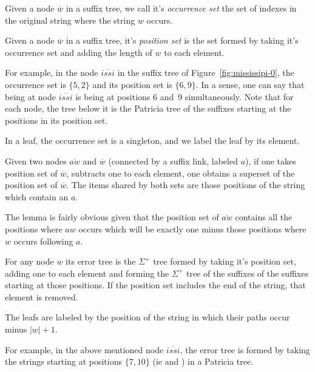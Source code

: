 \begin{definition}
Given a node $\overline{w}$ in a suffix tree, we call it's \emph{occurrence set} the set of indexes in the original string where the string $w$ occurs.
\end{definition}

\begin{definition}
Given a node $\overline{w}$ in a suffix tree, it's \emph{position set} is the set formed by taking it's occurrence set and adding the length of $w$ to each element.
\end{definition}

For example, in the node $\overline{issi}$ in the suffix tree of Figure~\ref{fig:mississipi-0}, the occurrence set is $\{5, 2\}$ and its position set is $\{6, 9\}$. In a sense, one can say that being at node $\overline{issi}$ is being at positions 6 and~9 simultaneously. Note that for each node, the tree below it is the Patricia tree of the suffixes starting at the positions in its position set.

In a leaf, the occurrence set is a singleton, and we label the leaf by its element.

\begin{lemma}\label{lemma:suffix-error}
Given two nodes $\overline{aw}$ and $\overline{w}$ (connected by a suffix link, labeled $a$), if one takes position set of $\overline{w}$, subtracts one to each element, one obtains a superset of the position set of $\overline{w}$. The items shared by both sets are those positions of the string which contain an $a$.
\end{lemma}

The lemma is fairly obvious given that the position set of $\overline{aw}$ contains all the positions where $aw$ occurs which will be exactly one minus those positions where $w$ occurs following $a$.

\begin{definition}
For any node $w$ its error tree is the $\Sigma^+$ tree formed by taking it's position set, adding one to each element and forming the $\Sigma^+$ tree of the suffixes of the suffixes starting at those positions. If the position set includes the end of the string, that element is removed.

The leafs are labeled by the position of the string in which their paths occur minus $|w| + 1$.
\end{definition}

For example, in the above mentioned node $\overline{issi}$, the error tree is formed by taking the strings starting at positions $\{7, 10\}$ (ie  and ) in a Patricia tree.


